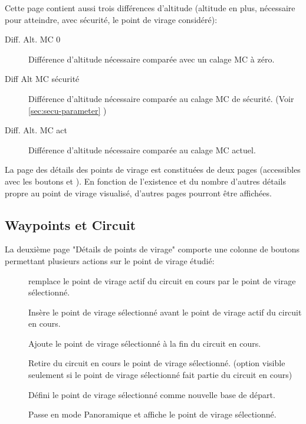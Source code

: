 Cette page contient aussi trois différences d'altitude (altitude en plus, nécessaire pour atteindre, avec sécurité,  le point de virage considéré):
\begin{description}
\item[Diff. Alt. MC 0] Différence d'altitude nécessaire comparée avec un calage MC à zéro.
\item[Diff Alt MC sécurité] Différence d'altitude nécessaire comparée au calage MC de sécurité. (Voir \ref{sec:secu-parameter} )
\item[Diff. Alt. MC act] Différence d'altitude nécessaire comparée au calage MC actuel.
\end{description}

La page des détails des points de virage est constituées de deux pages (accessibles avec les boutons \button{$>$} et \button{$<$} ). En fonction de l'existence et du nombre d'autres détails propre au point de virage visualisé, d'autres pages pourront être affichées.

\subsection*{Waypoints et Circuit}  
La deuxième page "Détails de points de virage" comporte une colonne de boutons permettant plusieurs actions sur le point de virage étudié:
\begin{description}
\item[] remplace le point de virage actif du circuit en cours par le point de virage sélectionné.
\item[] Insère le point de virage sélectionné avant le point de virage actif du circuit en cours.
\item[] Ajoute le point de virage sélectionné à la fin du circuit en cours.
\item[] Retire du circuit en cours le point de virage sélectionné. (option visible seulement si le point de virage sélectionné fait partie du circuit en cours)
\item[] Défini le point de virage sélectionné comme nouvelle base de départ.
\item[] Passe en mode Panoramique et affiche le point de virage sélectionné.


\end{description}

